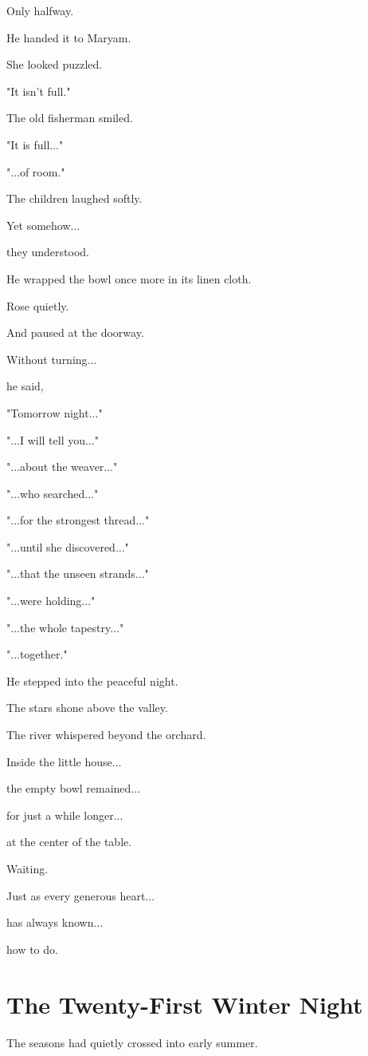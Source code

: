 \documentclass[12pt,openany]{book}
\begin{document}
Only halfway.

He handed it to Maryam.

She looked puzzled.

"It isn't full."

The old fisherman smiled.

"It is full..."

"...of room."

The children laughed softly.

Yet somehow...

they understood.

He wrapped the bowl once more in its linen cloth.

Rose quietly.

And paused at the doorway.

Without turning...

he said,

"Tomorrow night..."

"...I will tell you..."

"...about the weaver..."

"...who searched..."

"...for the strongest thread..."

"...until she discovered..."

"...that the unseen strands..."

"...were holding..."

"...the whole tapestry..."

"...together."

He stepped into the peaceful night.

The stars shone above the valley.

The river whispered beyond the orchard.

Inside the little house...

the empty bowl remained...

for just a while longer...

at the center of the table.

Waiting.

Just as every generous heart...

has always known...

how to do.
\chapter{The Twenty-First Winter Night}

The seasons had quietly crossed into early summer.
\end{document}
